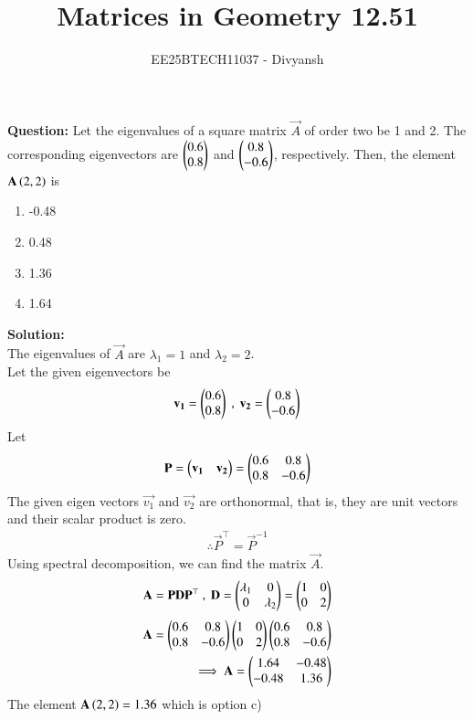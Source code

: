 \documentclass[journal,12pt,onecolumn]{IEEEtran}
\title{Matrices in Geometry 12.51}
\author{EE25BTECH11037 - Divyansh}
\theoremstyle{remark}
\begin{document}
\vspace{3cm}
\maketitle
{\let\newpage\relax\maketitle}
\textbf{Question: }
Let the eigenvalues of a square matrix $\vec{A}$ of order two be 1 and 2. The corresponding eigenvectors are $\begin{pmatrix}0.6 \\ 0.8\end{pmatrix}$ and $\begin{pmatrix}0.8 \\ -0.6\end{pmatrix}$, respectively. Then, the element $\mathbf{A}\left(2, 2\right)$ is
\begin{multicols}{4}
    \begin{enumerate}[label=\alph*)]
        \item -0.48
        \item 0.48
        \item 1.36
        \item 1.64
    \end{enumerate}
\end{multicols}
\vspace{2mm}

\textbf{Solution:}\\
The eigenvalues of $\vec{A}$ are $\lambda_1=1$ and $\lambda_2=2$.\\
Let the given eigenvectors be
\begin{align}
    \mathbf{v_1}=\begin{pmatrix}0.6 \\ 0.8\end{pmatrix} \ , \ \mathbf{v_2}=\begin{pmatrix}0.8 \\ -0.6\end{pmatrix}
\end{align}
Let
\begin{align}
    \mathbf{P}=\begin{pmatrix}\mathbf{v_1} & \mathbf{v_2}\end{pmatrix}=\begin{pmatrix}0.6 & 0.8 \\ 0.8 & -0.6\end{pmatrix}
\end{align}
The given eigen vectors $\vec{v_1}$ and $\vec{v_2}$ are orthonormal, that is, they are unit vectors and their scalar product is zero. 
\begin{align}
    \therefore \vec{P}^{\top} = \vec{P}^{-1}
\end{align}
Using spectral decomposition, we can find the matrix $\vec{A}$.
\begin{align}
    \mathbf{A}=\mathbf{P}\mathbf{D}\mathbf{P}^{\top} \ , \ \mathbf{D}=\begin{pmatrix}\lambda_1 & 0 \\ 0 & \lambda_2\end{pmatrix}=\begin{pmatrix}1 & 0 \\ 0 &2\end{pmatrix}
\end{align}
\begin{align}
    \mathbf{A}=\begin{pmatrix}0.6 & 0.8 \\ 0.8 & -0.6\end{pmatrix}\begin{pmatrix}1 & 0 \\ 0 &2\end{pmatrix}\begin{pmatrix}0.6 & 0.8 \\ 0.8 & -0.6\end{pmatrix}\\
    \implies \mathbf{A}=\begin{pmatrix}1.64 & -0.48 \\ -0.48 & 1.36\end{pmatrix}
\end{align}
The element $\mathbf{A}\left(2, 2\right) = 1.36$ which is option c)
\end{document}
